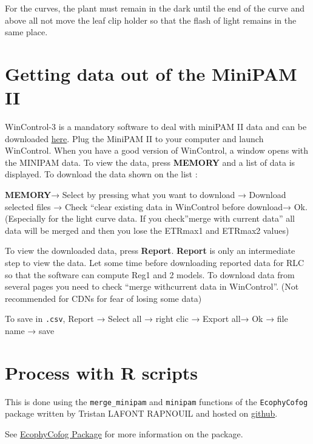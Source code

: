 \documentclass[
  12pt,
  american,
  a4paper,
  extrafontsizes,onecolumn,openright
  ]{memoir}
\begin{document}
For the curves, the plant must remain in the dark until the end of the curve and above all not move the leaf clip holder so that the flash of light remains in the same place.

\hypertarget{getting-data-out-of-the-minipam-ii}{%
\section{Getting data out of the MiniPAM II}\label{getting-data-out-of-the-minipam-ii}}

WinControl-3 is a mandatory software to deal with miniPAM II data and can be downloaded \href{https://www.walz.com/products/chl_p700/mini-pam-II/downloads.html}{here}.
Plug the MiniPAM II to your computer and launch WinControl.
When you have a good version of WinControl, a window opens with the MINIPAM data.
To view the data, press \textbf{MEMORY} and a list of data is displayed.
To download the data shown on the list :

\textbf{MEMORY}→ Select by pressing what you want to download → Download selected files → Check ``clear existing data in WinControl before download→ Ok.
(Especially for the light curve data. If you check''merge with current data'' all data will be merged and then you lose the ETRmax1 and ETRmax2 values)

To view the downloaded data, press \textbf{Report}.
\textbf{Report} is only an intermediate step to view the data.
Let some time before downloading reported data for RLC so that the software can compute Reg1 and 2 models.
To download data from several pages you need to check ``merge withcurrent data in WinControl''.
(Not recommended for CDNs for fear of losing some data)

To save in \texttt{.csv}, Report → Select all → right clic → Export all→ Ok → file name → save

\hypertarget{process-with-r-scripts}{%
\section{Process with R scripts}\label{process-with-r-scripts}}

This is done using the \texttt{merge\_minipam} and \texttt{minipam} functions of the \texttt{EcophyCofog} package written by Tristan LAFONT RAPNOUIL and hosted on \href{https://github.com/LafontRapnouilTristan/EcophyCofog}{github}.

See \protect\hyperlink{ecophycofog-package}{EcophyCofog Package} for more information on the package.
\end{document}
